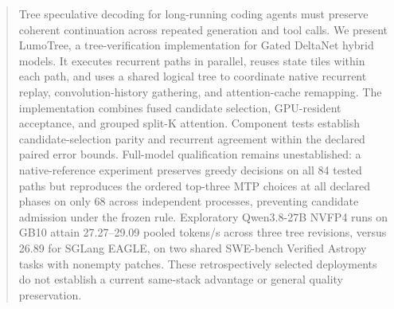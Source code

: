 \begin{abstract}
Tree speculative decoding for long-running coding agents must preserve coherent continuation across repeated generation and tool calls. We present LumoTree, a tree-verification implementation for Gated DeltaNet hybrid models. It executes recurrent paths in parallel, reuses state tiles within each path, and uses a shared logical tree to coordinate native recurrent replay, convolution-history gathering, and attention-cache remapping. The implementation combines fused candidate selection, GPU-resident acceptance, and grouped split-K attention. Component tests establish candidate-selection parity and recurrent agreement within the declared paired error bounds. Full-model qualification remains unestablished: a native-reference experiment preserves greedy decisions on all 84 tested paths but reproduces the ordered top-three MTP choices at all declared phases on only 68 across independent processes, preventing candidate admission under the frozen rule. Exploratory Qwen3.8-27B NVFP4 runs on GB10 attain 27.27--29.09 pooled tokens/s across three tree revisions, versus 26.89 for SGLang EAGLE, on two shared SWE-bench Verified Astropy tasks with nonempty patches. These retrospectively selected deployments do not establish a current same-stack advantage or general quality preservation.
\end{abstract}
